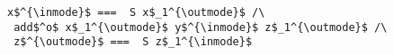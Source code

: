 \begin{figure}[!t]
  \centering
  \begin{minipage}{0.57\columnwidth}
    \begin{lstlisting}[frame=tb]
 x$^{\inmode}$ ===  S x$_1^{\outmode}$ /\
 add$^o$ x$_1^{\outmode}$ y$^{\inmode}$ z$_1^{\outmode}$ /\
 z$^{\outmode}$ ===  S z$_1^{\inmode}$
    \end{lstlisting}
  \end{minipage}
\end{figure}